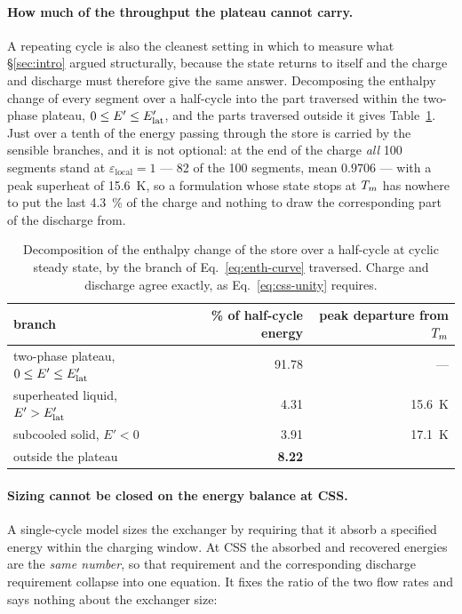 \paragraph{How much of the throughput the plateau cannot carry.}
A repeating cycle is also the cleanest setting in which to measure what
\S\ref{sec:intro} argued structurally, because the state returns to itself and
the charge and discharge must therefore give the same answer. Decomposing the
enthalpy change of every segment over a half-cycle into the part traversed
within the two-phase plateau, $0\le E'\le E'_{\mathrm{lat}}$, and the parts traversed outside
it gives Table~\ref{tab:branches}. Just over a tenth of the energy passing
through the store is carried by the sensible branches, and it is not optional:
at the end of the charge \emph{all} \num{100} segments stand at
$\varepsilon_{\mathrm{local}}=1$ --- \num{82} of the \num{100} segments, mean
$0.9706$ --- with a peak superheat of \SI{15.6}{\kelvin}, so a formulation whose
state stops at $T_{m}$ has nowhere to put the last \SI{4.3}{\percent} of the
charge and nothing to draw the corresponding part of the discharge from.

\begin{table}[htbp]
\centering
\caption{Decomposition of the enthalpy change of the store over a half-cycle at
cyclic steady state, by the branch of Eq.~\eqref{eq:enth-curve} traversed.
Charge and discharge agree exactly, as Eq.~\eqref{eq:css-unity} requires.}
\label{tab:branches}
\begin{tabular}{@{}l r r@{}}
\toprule
branch & \% of half-cycle energy & peak departure from $T_{m}$ \\
\midrule
two-phase plateau, $0\le E'\le E'_{\mathrm{lat}}$ & 91.78 & --- \\
superheated liquid, $E'>E'_{\mathrm{lat}}$       &  4.31 & \SI{15.6}{\kelvin} \\
subcooled solid, $E'<0$              &  3.91 & \SI{17.1}{\kelvin} \\
\midrule
outside the plateau                  & \textbf{8.22} & \\
\bottomrule
\end{tabular}
\end{table}

\paragraph{Sizing cannot be closed on the energy balance at CSS.}
A single-cycle model sizes the exchanger by requiring that it absorb a specified
energy within the charging window. At CSS the absorbed and recovered energies
are the \emph{same number}, so that requirement and the corresponding discharge
requirement collapse into one equation. It fixes the ratio of the two flow rates
and says nothing about the exchanger size:

